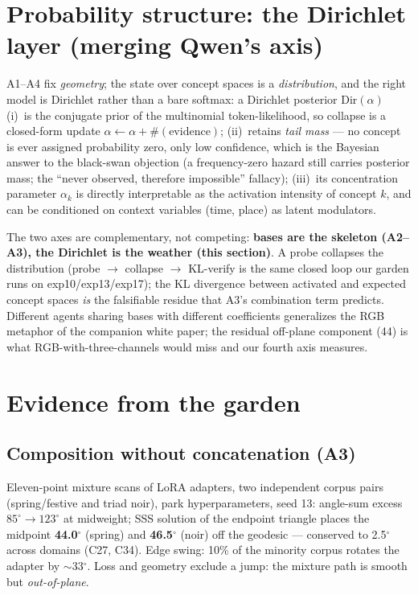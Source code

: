 \documentclass[11pt]{article}
\begin{document}
\section{Probability structure: the Dirichlet layer (merging Qwen's axis)}
A1--A4 fix \emph{geometry}; the state over concept spaces is a \emph{distribution}, and the
right model is Dirichlet rather than a bare softmax: a Dirichlet posterior $\mathrm{Dir}(\alpha)$
(i)\ is the conjugate prior of the multinomial token-likelihood, so collapse is a closed-form
update $\alpha\!\leftarrow\!\alpha+\#(\text{evidence})$; (ii)\ retains \emph{tail mass} ---
no concept is ever assigned probability zero, only low confidence, which is the Bayesian
answer to the black-swan objection (a frequency-zero hazard still carries posterior mass;
the ``never observed, therefore impossible'' fallacy); (iii)\ its concentration parameter
$\alpha_k$ is directly interpretable as the activation intensity of concept $k$, and can be
conditioned on context variables (time, place) as latent modulators.

The two axes are complementary, not competing: \textbf{bases are the skeleton (A2--A3),
the Dirichlet is the weather (this section)}. A probe collapses the distribution
(probe $\to$ collapse $\to$ KL-verify is the same closed loop our garden runs on
exp10/exp13/exp17); the KL divergence between activated and expected concept spaces
\emph{is} the falsifiable residue that A3's combination term predicts. Different agents
sharing bases with different coefficients generalizes the RGB metaphor of the companion
white paper; the residual off-plane component (44\textdegree) is what RGB-with-three-channels
would miss and our fourth axis measures.

\section{Evidence from the garden}
\subsection{Composition without concatenation (A3)}
Eleven-point mixture scans of LoRA adapters, two independent corpus pairs
(spring/festive and triad noir), park hyperparameters, seed 13:
angle-sum excess $85^\circ\!\to\!123^\circ$ at midweight; SSS solution of the
endpoint triangle places the midpoint \textbf{44.0$^\circ$} (spring) and \textbf{46.5$^\circ$}
(noir) off the geodesic --- conserved to 2.5$^\circ$ across domains (C27, C34).
Edge swing: 10\% of the minority corpus rotates the adapter by $\sim$33$^\circ$.
Loss and geometry exclude a jump: the mixture path is smooth but \emph{out-of-plane}.
\end{document}
